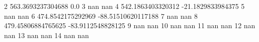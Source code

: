 2 563.3693237304688 0.0
3 nan nan
4 542.1863403320312 -21.1829833984375
5 nan nan
6 474.8542175292969 -88.51510620117188
7 nan nan
8 479.45806884765625 -83.9112548828125
9 nan nan
10 nan nan
11 nan nan
12 nan nan
13 nan nan
14 nan nan
